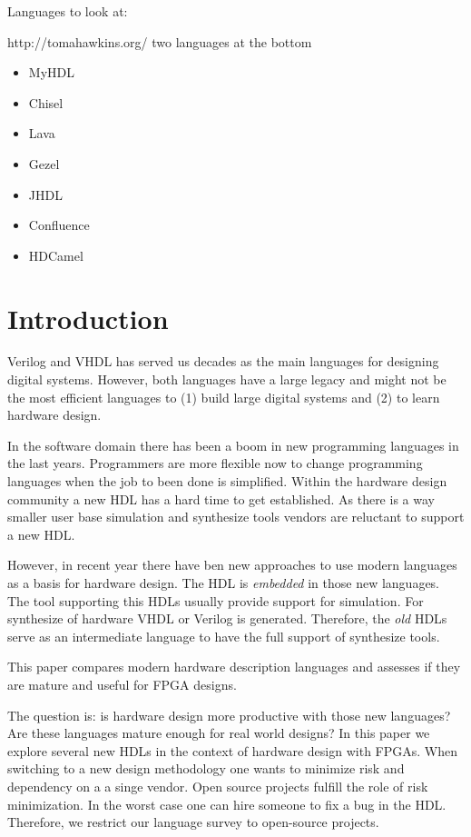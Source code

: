 \documentclass[10pt, technote, draftcls, onecolumn]{IEEEtran}
\begin{document}
Languages to look at:

http://tomahawkins.org/ two languages at the bottom

\begin{itemize}
   \item MyHDL
   \item Chisel
   \item Lava
   \item Gezel
   \item JHDL
   \item Confluence
   \item HDCamel
\end{itemize}

\section{Introduction}

Verilog and VHDL has served us decades as the main languages for designing
digital systems. However, both languages have a large legacy and might not be
the most efficient languages to (1) build large digital systems and (2) to learn
hardware design.

In the software domain there has been a boom in new programming languages
in the last years. Programmers are more flexible now to change programming
languages when the job to been done is simplified. Within the hardware design
community a new HDL has a hard time to get established. As there is a way
smaller user base simulation and synthesize tools vendors are reluctant to
support a new HDL.

However, in recent year there have ben new approaches to use modern
languages as a basis for hardware design. The HDL is \emph{embedded}
in those new languages. The tool supporting this HDLs usually provide
support for simulation. For synthesize of hardware VHDL or Verilog is
generated. Therefore, the \emph{old} HDLs serve as an intermediate
language to have the full support of synthesize tools.

This paper compares modern hardware description languages and
assesses if they are mature and useful for FPGA designs.

The question is: is hardware design more productive with those new
languages? Are these languages mature enough for real world designs?
In this paper we explore several new HDLs in the context of hardware
design with FPGAs. When switching to a new design methodology one
wants to minimize risk and dependency on a a singe vendor. Open source
projects fulfill the role of risk minimization. In the worst case one can hire
someone to fix a bug in the HDL. Therefore, we restrict our language survey
to open-source projects.
\end{document}
